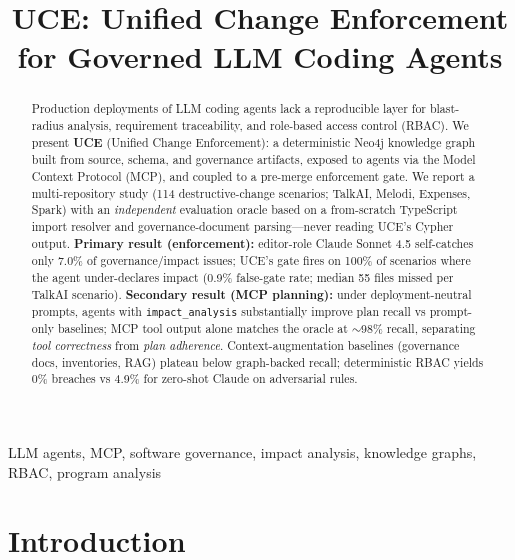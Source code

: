 \documentclass[conference]{IEEEtran}
\begin{document}
\title{UCE: Unified Change Enforcement for Governed LLM Coding Agents}

\author{
}

\maketitle

\begin{abstract}
Production deployments of LLM coding agents lack a reproducible layer for blast-radius analysis, requirement traceability, and role-based access control (RBAC).
We present \textbf{UCE} (Unified Change Enforcement): a deterministic Neo4j knowledge graph built from source, schema, and governance artifacts, exposed to agents via the Model Context Protocol (MCP), and coupled to a pre-merge enforcement gate.
We report a multi-repository study (114 destructive-change scenarios; TalkAI, Melodi, Expenses, Spark) with an \emph{independent} evaluation oracle based on a from-scratch TypeScript import resolver and governance-document parsing---never reading UCE's Cypher output.
\textbf{Primary result (enforcement):} editor-role Claude Sonnet 4.5 self-catches only 7.0\% of governance/impact issues; UCE's gate fires on 100\% of scenarios where the agent under-declares impact (0.9\% false-gate rate; median 55 files missed per TalkAI scenario).
\textbf{Secondary result (MCP planning):} under deployment-neutral prompts, agents with \texttt{impact\_analysis} substantially improve plan recall vs prompt-only baselines; MCP tool output alone matches the oracle at ${\sim}$98\% recall, separating \emph{tool correctness} from \emph{plan adherence}.
Context-augmentation baselines (governance docs, inventories, RAG) plateau below graph-backed recall; deterministic RBAC yields 0\% breaches vs 4.9\% for zero-shot Claude on adversarial rules.
\end{abstract}

\begin{IEEEkeywords}
LLM agents, MCP, software governance, impact analysis, knowledge graphs, RBAC, program analysis
\end{IEEEkeywords}

\section{Introduction}
\label{sec:intro}
\end{document}
